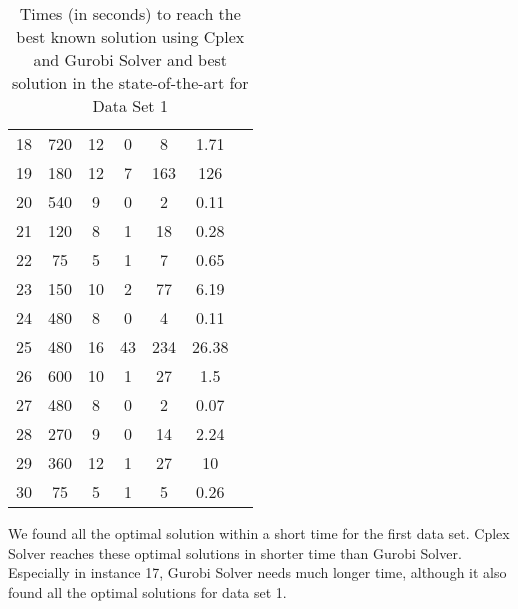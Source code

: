 \begin{table}
\begin{tabular}{ccccccc}
18 &   720	& 12 & 0 & 8 & 1.71  & \cite{li:2007:gaspero}\\

19 &  180	& 12 & 7 & 163 & 126 & \cite{li:2007:gaspero} \\

20 &   540	& 9 & 0 & 2 & 0.11  & \cite{li:2007:gaspero}\\

21 &  120	& 8 & 1 & 18 & 0.28 & \cite{li:2007:gaspero}  \\

22 &  75	& 5 & 1 & 7  & 0.65 & \cite{li:2007:gaspero}\\

23 &  150 	& 10 & 2 & 77 & 6.19  & \cite{li:2007:gaspero}   \\

24 &  480	& 8 & 0 & 4   & 0.11 & \cite{li:2007:gaspero}\\

25 &  480	& 16 & 43 & 234  & 26.38 & \cite{li:2010:abseher}     \\

26 &  600	& 10 & 1 & 27 & 1.5 & \cite{li:2007:gaspero} \\

27 &  480	& 8 & 0 & 2 & 0.07 & \cite{li:2007:gaspero} \\

28 &   270	& 9 & 0 & 14 & 2.24  &  \cite{li:2007:gaspero}\\

29 &  360	& 12 & 1 & 27 & 10 & \cite{li:2007:gaspero} \\

30 &  75	& 5 & 1 & 5 & 0.26 & \cite{li:2007:gaspero} \\
\hline
\end{tabular}
\caption{Times (in seconds) to reach the best known solution using Cplex and Gurobi Solver and best solution in the state-of-the-art for Data Set 1}
\label{tbl:dataset1}
\end{table}

We found all the optimal solution within a short time for the first data set. Cplex Solver reaches these optimal solutions in shorter time than Gurobi Solver. Especially in instance 17, Gurobi Solver needs much longer time, although it also found all the optimal solutions for data set 1.


